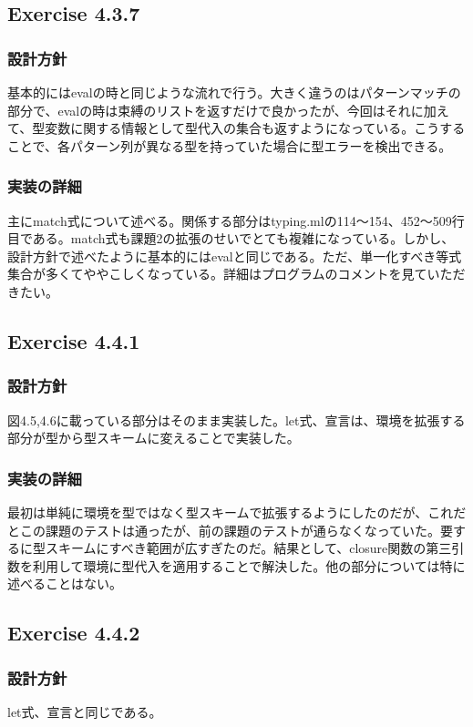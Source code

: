 \documentclass{jarticle}
\begin{document}
\subsection{Exercise 4.3.7}
\subsubsection{設計方針}
基本的にはevalの時と同じような流れで行う。大きく違うのはパターンマッチの部分で、evalの時は束縛のリストを返すだけで良かったが、今回はそれに加えて、型変数に関する情報として型代入の集合も返すようになっている。こうすることで、各パターン列が異なる型を持っていた場合に型エラーを検出できる。
\subsubsection{実装の詳細}
主にmatch式について述べる。関係する部分はtyping.mlの114〜154、452〜509行目である。match式も課題2の拡張のせいでとても複雑になっている。しかし、設計方針で述べたように基本的にはevalと同じである。ただ、単一化すべき等式集合が多くてややこしくなっている。詳細はプログラムのコメントを見ていただきたい。

\subsection{Exercise 4.4.1}
\subsubsection{設計方針}
図4.5,4.6に載っている部分はそのまま実装した。let式、宣言は、環境を拡張する部分が型から型スキームに変えることで実装した。
\subsubsection{実装の詳細}
最初は単純に環境を型ではなく型スキームで拡張するようにしたのだが、これだとこの課題のテストは通ったが、前の課題のテストが通らなくなっていた。要するに型スキームにすべき範囲が広すぎたのだ。結果として、closure関数の第三引数を利用して環境に型代入を適用することで解決した。他の部分については特に述べることはない。

\subsection{Exercise 4.4.2}
\subsubsection{設計方針}
let式、宣言と同じである。
\end{document}
